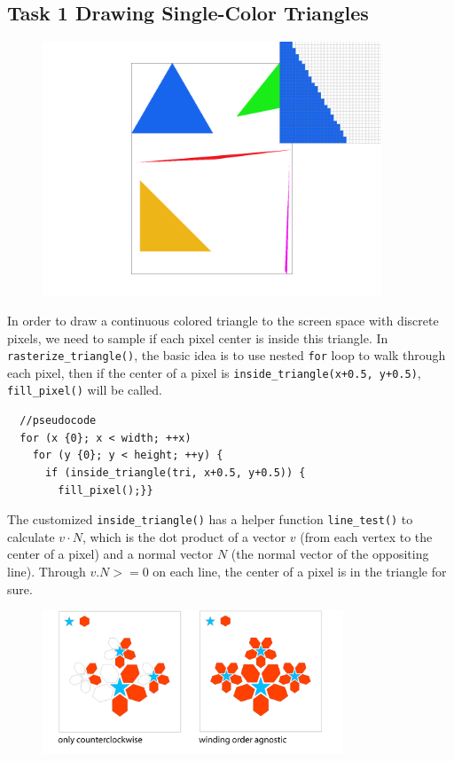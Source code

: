 \documentclass[11pt]{article}
\begin{document}
\subsection*{Task 1 Drawing Single-Color Triangles}
\begin{figure}[h]
    \centering
    \includegraphics[width=0.9\textwidth]{T1.png} 
    \caption{}%
\end{figure}
In order to draw a continuous colored triangle to the screen space
with discrete pixels, we need to sample if each pixel center is inside this
triangle. In \texttt{rasterize\_triangle()}, the basic idea is
to use nested \texttt{for} loop to walk through each pixel, then if
the center of a pixel is \texttt{inside\_triangle(x+0.5, y+0.5)}, \texttt{fill\_pixel()} will be called.
\begin{verbatim}
  //pseudocode
  for (x {0}; x < width; ++x)
    for (y {0}; y < height; ++y) {
      if (inside_triangle(tri, x+0.5, y+0.5)) {
        fill_pixel();}}
\end{verbatim}

The customized \texttt{inside\_triangle()} has a helper function \texttt{line\_test()} to 
calculate $v \cdot N$, which is the dot product of a vector $v$ (from each vertex to the center of a pixel)
and a normal vector $N$ (the normal vector of the oppositing line). Through $v.N >= 0$ on each
line, the center of a pixel is in the triangle for sure.
\begin{figure}[h]
    \centering
    \includegraphics[width=0.8\textwidth]{T13.png} %
\end{figure}
\end{document}
